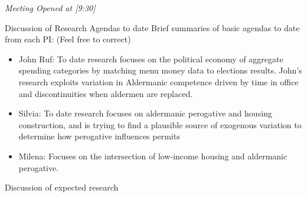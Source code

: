 \documentclass[10pt,a4paper,twoside]{mins}
\begin{document}
\begin{minutes}
\begin{center}\emph{Meeting Opened at [9:30]}\end{center}
\begin{business}
\item Discussion of Research Agendas to date
Brief summaries of basic agendas to date from each PI: 
(Feel free to correct)
\begin{itemize}
    \item John Ruf: To date research focuses on the political economy of aggregate spending categories by matching menu money data to elections results. John's research exploits variation in Aldermanic competence driven by time in office and discontinuities when aldermen are replaced. 
    \item Silvia: To date research focuses on aldermanic perogative and housing construction, and is trying to find a plausible source of exogenous variation to determine how perogative influences permits
    \item Milena: Focuses on the intersection of low-income housing and aldermanic perogative.
\end{itemize}

\item Discussion of expected research


\end{business}
\end{minutes}
\end{document}
